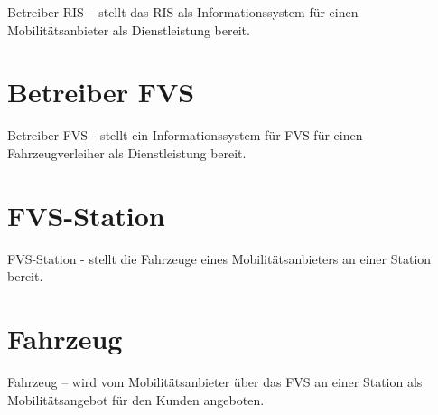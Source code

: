Betreiber RIS – stellt das RIS als Informationssystem für einen Mobilitätsanbieter als Dienstleistung bereit.


\section{Betreiber FVS}
Betreiber FVS - stellt ein Informationssystem für FVS für einen Fahrzeugverleiher als Dienstleistung bereit.


\section{FVS-Station}

FVS-Station - stellt die Fahrzeuge eines Mobilitätsanbieters an einer Station bereit.


\section{Fahrzeug}

Fahrzeug – wird vom Mobilitätsanbieter über das FVS an einer Station als Mobilitätsangebot für den Kunden angeboten.


